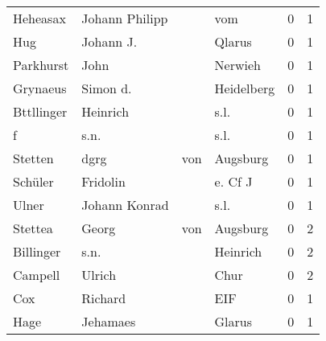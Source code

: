 \begin{center}
\begin{tiny}
\begin{longtabu}{llllrr}
                 Heheasax &                     Johann Philipp &             &                                         vom &          0 &         1 \\
                      Hug &                          Johann J. &             &                                      Qlarus &          0 &         1 \\
                Parkhurst &                               John &             &                                     Nerwieh &          0 &         1 \\
                 Grynaeus &                           Simon d. &             &                                  Heidelberg &          0 &         1 \\
               Bttllinger &                           Heinrich &             &                                        s.l. &          0 &         1 \\
                        f &                               s.n. &             &                                        s.l. &          0 &         1 \\
                  Stetten &                               dgrg &         von &                                    Augsburg &          0 &         1 \\
                  Schüler &                           Fridolin &             &                                     e. Cf J &          0 &         1 \\
                    Ulner &                      Johann Konrad &             &                                        s.l. &          0 &         1 \\
                  Stettea &                              Georg &         von &                                    Augsburg &          0 &         2 \\
                Billinger &                               s.n. &             &                                    Heinrich &          0 &         2 \\
                  Campell &                             Ulrich &             &                                        Chur &          0 &         2 \\
                      Cox &                            Richard &             &                                         EIF &          0 &         1 \\
                     Hage &                           Jehamaes &             &                                      Glarus &          0 &         1 \\

\end{longtabu}
\end{tiny}
\end{center}
